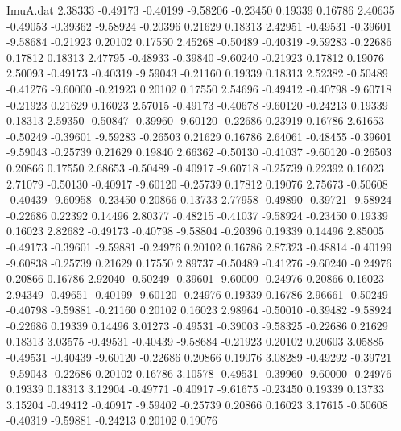 \begin{filecontents}{ImuA.dat}
   2.38333   -0.49173   -0.40199   -9.58206   -0.23450    0.19339    0.16786
   2.40635   -0.49053   -0.39362   -9.58924   -0.20396    0.21629    0.18313
   2.42951   -0.49531   -0.39601   -9.58684   -0.21923    0.20102    0.17550
   2.45268   -0.50489   -0.40319   -9.59283   -0.22686    0.17812    0.18313
   2.47795   -0.48933   -0.39840   -9.60240   -0.21923    0.17812    0.19076
   2.50093   -0.49173   -0.40319   -9.59043   -0.21160    0.19339    0.18313
   2.52382   -0.50489   -0.41276   -9.60000   -0.21923    0.20102    0.17550
   2.54696   -0.49412   -0.40798   -9.60718   -0.21923    0.21629    0.16023
   2.57015   -0.49173   -0.40678   -9.60120   -0.24213    0.19339    0.18313
   2.59350   -0.50847   -0.39960   -9.60120   -0.22686    0.23919    0.16786
   2.61653   -0.50249   -0.39601   -9.59283   -0.26503    0.21629    0.16786
   2.64061   -0.48455   -0.39601   -9.59043   -0.25739    0.21629    0.19840
   2.66362   -0.50130   -0.41037   -9.60120   -0.26503    0.20866    0.17550
   2.68653   -0.50489   -0.40917   -9.60718   -0.25739    0.22392    0.16023
   2.71079   -0.50130   -0.40917   -9.60120   -0.25739    0.17812    0.19076
   2.75673   -0.50608   -0.40439   -9.60958   -0.23450    0.20866    0.13733
   2.77958   -0.49890   -0.39721   -9.58924   -0.22686    0.22392    0.14496
   2.80377   -0.48215   -0.41037   -9.58924   -0.23450    0.19339    0.16023
   2.82682   -0.49173   -0.40798   -9.58804   -0.20396    0.19339    0.14496
   2.85005   -0.49173   -0.39601   -9.59881   -0.24976    0.20102    0.16786
   2.87323   -0.48814   -0.40199   -9.60838   -0.25739    0.21629    0.17550
   2.89737   -0.50489   -0.41276   -9.60240   -0.24976    0.20866    0.16786
   2.92040   -0.50249   -0.39601   -9.60000   -0.24976    0.20866    0.16023
   2.94349   -0.49651   -0.40199   -9.60120   -0.24976    0.19339    0.16786
   2.96661   -0.50249   -0.40798   -9.59881   -0.21160    0.20102    0.16023
   2.98964   -0.50010   -0.39482   -9.58924   -0.22686    0.19339    0.14496
   3.01273   -0.49531   -0.39003   -9.58325   -0.22686    0.21629    0.18313
   3.03575   -0.49531   -0.40439   -9.58684   -0.21923    0.20102    0.20603
   3.05885   -0.49531   -0.40439   -9.60120   -0.22686    0.20866    0.19076
   3.08289   -0.49292   -0.39721   -9.59043   -0.22686    0.20102    0.16786
   3.10578   -0.49531   -0.39960   -9.60000   -0.24976    0.19339    0.18313
   3.12904   -0.49771   -0.40917   -9.61675   -0.23450    0.19339    0.13733
   3.15204   -0.49412   -0.40917   -9.59402   -0.25739    0.20866    0.16023
   3.17615   -0.50608   -0.40319   -9.59881   -0.24213    0.20102    0.19076

\end{filecontents}
